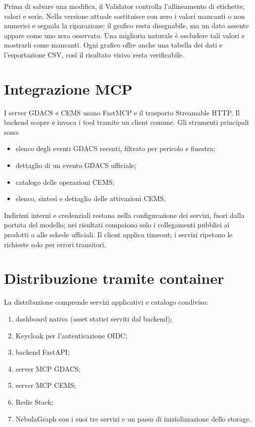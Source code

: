 Prima di salvare una modifica, il Validator controlla l'allineamento di
etichette, valori e serie. Nella versione attuale sostituisce con zero i valori
mancanti o non numerici e segnala la riparazione: il grafico resta disegnabile,
ma un dato assente appare come uno zero osservato. Una miglioria naturale è
escludere tali valori e mostrarli come mancanti. Ogni grafico offre anche una
tabella dei dati e l'esportazione CSV, così il risultato visivo resta
verificabile.

\section{Integrazione MCP}

I server GDACS e CEMS usano FastMCP e il trasporto Streamable HTTP. Il backend
scopre e invoca i tool tramite un client comune. Gli strumenti principali sono:

\begin{itemize}
    \item elenco degli eventi GDACS recenti, filtrato per pericolo e finestra;
    \item dettaglio di un evento GDACS ufficiale;
    \item catalogo delle operazioni CEMS;
    \item elenco, sintesi e dettaglio delle attivazioni CEMS.
\end{itemize}

Indirizzi interni e credenziali restano nella configurazione dei servizi,
fuori dalla portata del modello; nei risultati compaiono solo i collegamenti
pubblici ai prodotti o alle schede ufficiali. Il client applica timeout; i
servizi ripetono le richieste solo per errori transitori.

\section{Distribuzione tramite container}

La distribuzione comprende servizi applicativi e catalogo condiviso:

\begin{enumerate}
    \item dashboard nativa (asset statici serviti dal backend);
    \item Keycloak per l'autenticazione OIDC;
    \item backend FastAPI;
    \item server MCP GDACS;
    \item server MCP CEMS;
    \item Redis Stack;
    \item NebulaGraph con i suoi tre servizi e un passo di inizializzazione
    dello storage.
\end{enumerate}

